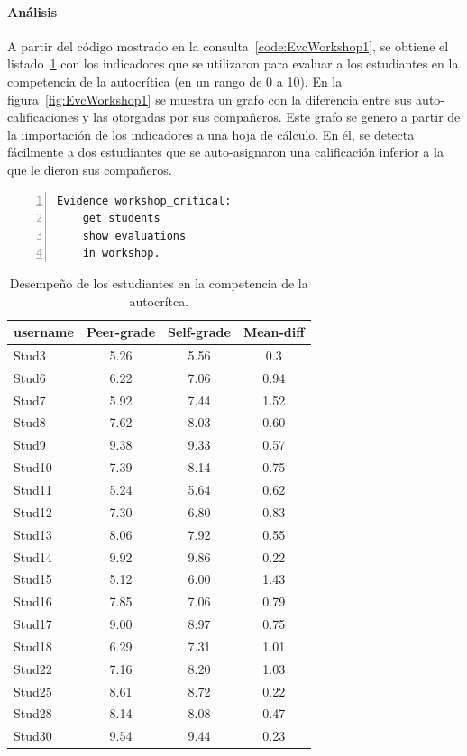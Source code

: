 \paragraph*{Análisis}

A partir del código mostrado en la consulta~\ref{code:EvcWorkshop1}, se obtiene el listado~\ref{tab:EvcWorkshop1} con los indicadores que se utilizaron para evaluar a los estudiantes en la competencia de la autocrítica (en un rango de 0 a 10). En la figura~\ref{fig:EvcWorkshop1} se muestra un grafo con la diferencia entre sus auto-calificaciones y las otorgadas por sus compañeros. Este grafo se genero a partir de la iimportación de los indicadores a una hoja de cálculo. En él, se detecta fácilmente a dos estudiantes que se auto-asignaron una calificación inferior a la que le dieron sus compañeros.

\begin{lstlisting}[caption=Extracción evaluaciones realizadas en los talleres ,label=code:EvcWorkshop1,numbers=left, captionpos=b, morekeywords={Evidence,get, students, show, milestones, evaluations, participation, access, in, assignment, forum, campus, between, and, workshop, interaction}]
Evidence workshop_critical: 
	get students
	show evaluations
	in workshop.
\end{lstlisting}

\begin{table}
	\centering
	\caption{Desempeño de los estudiantes en la competencia de la autocrítca.}
	\label{tab:EvcWorkshop1}
	\begin{tabular}{|l|c|c|c|}
		\hline
		username & Peer-grade & Self-grade & Mean-diff \\
		\hline
		\hline
			Stud3 & 5.26 & 5.56 & 0.3 \\
			Stud6 & 6.22 & 7.06 & 0.94 \\
			Stud7 & 5.92 & 7.44 & 1.52 \\
			Stud8 & 7.62 & 8.03 & 0.60 \\
			Stud9 & 9.38 & 9.33 & 0.57 \\
			Stud10 & 7.39 & 8.14 & 0.75 \\
			Stud11 & 5.24 & 5.64 & 0.62 \\
			Stud12 & 7.30 & 6.80 & 0.83 \\
			Stud13 & 8.06 & 7.92 & 0.55 \\
			Stud14 & 9.92 & 9.86 & 0.22 \\
			Stud15 & 5.12 & 6.00 & 1.43 \\
			Stud16 & 7.85 & 7.06 & 0.79 \\
			Stud17 & 9.00 & 8.97 & 0.75 \\
			Stud18 & 6.29 & 7.31 & 1.01 \\
			Stud22 & 7.16 & 8.20 & 1.03 \\
			Stud25 & 8.61 & 8.72 & 0.22 \\
			Stud28 & 8.14 & 8.08 & 0.47 \\
			Stud30 & 9.54 & 9.44 & 0.23 \\
		\hline
	\end{tabular}
\end{table}

